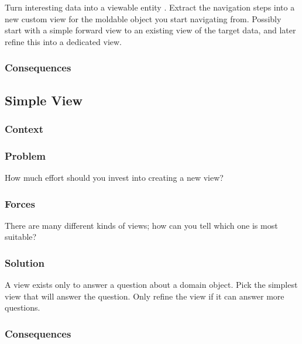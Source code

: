 \documentclass[sigconf]{acmart}
\begin{document}
Turn interesting data into a viewable entity . Extract the navigation steps into a new custom view for the moldable object you start navigating from. Possibly start with a simple forward view to an existing view of the target data, and later refine this into a dedicated view.



\subsubsection*{Consequences}



\subsection*{Simple View}\label{pat:simpleView}
\subsubsection*{Context}
\subsubsection*{Problem}

How much effort should you invest into creating a new view?


\subsubsection*{Forces}

There are many different kinds of views; how can you tell which one is most suitable?



\subsubsection*{Solution}

A view exists only to answer a question about a domain object. Pick the simplest view that will answer the question. Only refine the view if it can answer more questions.


\subsubsection*{Consequences}
\end{document}
